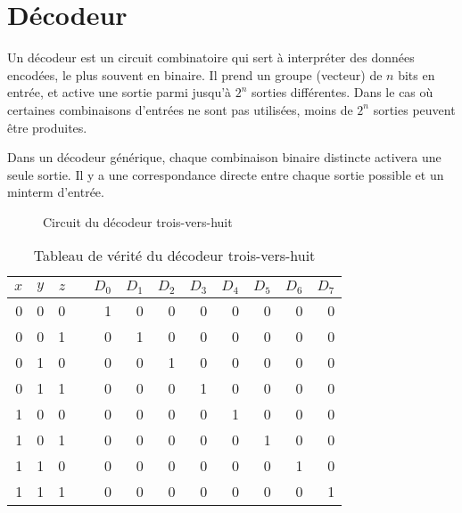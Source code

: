 \documentclass[letter, oneside]{book}
\begin{document}
\section{Décodeur}
\label{sec:orgc4764d9}

Un décodeur est un circuit combinatoire qui sert à interpréter des
données encodées, le plus souvent en binaire. Il prend un groupe
(vecteur) de \(n\) bits en entrée, et active une sortie parmi jusqu'à
\(2^n\) sorties différentes. Dans le cas où certaines combinaisons
d'entrées ne sont pas utilisées, moins de \(2^n\) sorties peuvent être
produites.

Dans un décodeur générique, chaque combinaison binaire distincte
activera une seule sortie. Il y a une correspondance directe entre
chaque sortie possible et un minterm d'entrée.

\begin{figure}[htbp]
\centering

\caption{\label{fig:org5d30a36}Circuit du décodeur trois-vers-huit}
\end{figure}


\begin{table}[htbp]
\caption{\label{tab:org7b81548}Tableau de vérité du décodeur trois-vers-huit}
\centering
\begin{tabular}{rrrlrrrrrrrr}
\(x\) & \(y\) & \(z\) &  & \(D_0\) & \(D_1\) & \(D_2\) & \(D_3\) & \(D_4\) & \(D_5\) & \(D_6\) & \(D_7\)\\[0pt]
\hline
0 & 0 & 0 &  & 1 & 0 & 0 & 0 & 0 & 0 & 0 & 0\\[0pt]
0 & 0 & 1 &  & 0 & 1 & 0 & 0 & 0 & 0 & 0 & 0\\[0pt]
0 & 1 & 0 &  & 0 & 0 & 1 & 0 & 0 & 0 & 0 & 0\\[0pt]
0 & 1 & 1 &  & 0 & 0 & 0 & 1 & 0 & 0 & 0 & 0\\[0pt]
1 & 0 & 0 &  & 0 & 0 & 0 & 0 & 1 & 0 & 0 & 0\\[0pt]
1 & 0 & 1 &  & 0 & 0 & 0 & 0 & 0 & 1 & 0 & 0\\[0pt]
1 & 1 & 0 &  & 0 & 0 & 0 & 0 & 0 & 0 & 1 & 0\\[0pt]
1 & 1 & 1 &  & 0 & 0 & 0 & 0 & 0 & 0 & 0 & 1\\[0pt]
\end{tabular}
\end{table}
\end{document}
